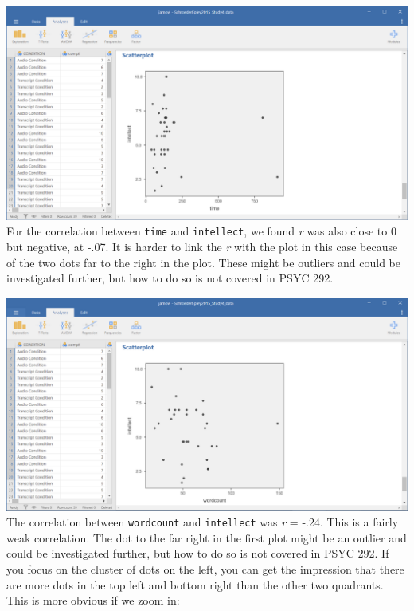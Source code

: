 \documentclass[
]{book}
\begin{document}
\includegraphics{img/7.4.70.png}
For the correlation between \texttt{time} and \texttt{intellect}, we found \emph{r} was also close to 0 but negative, at -.07. It is harder to link the \emph{r} with the plot in this case because of the two dots far to the right in the plot. These might be outliers and could be investigated further, but how to do so is not covered in PSYC 292.

\includegraphics{img/7.4.71.png}
The correlation between \texttt{wordcount} and \texttt{intellect} was \emph{r} = -.24. This is a fairly weak correlation. The dot to the far right in the first plot might be an outlier and could be investigated further, but how to do so is not covered in PSYC 292. If you focus on the cluster of dots on the left, you can get the impression that there are more dots in the top left and bottom right than the other two quadrants. This is more obvious if we zoom in:
\end{document}
